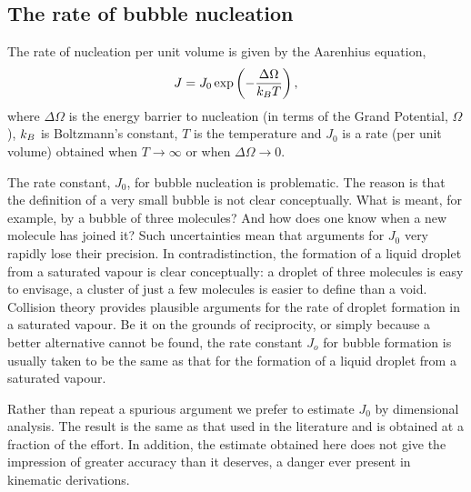 \subsection{The rate of bubble nucleation}


The rate of nucleation per unit volume is given by the Aarenhius equation, 
\begin{align}
J = J_0\exp \lr{-\frac{\Delta \Omega}{\kB T}},%
\label{eqn:nuc:J}
\end{align}
where $\Delta \Omega$ is the energy barrier to nucleation (in terms of the Grand Potential, $\Omega$),
$k_B$ is Boltzmann's constant, $T$ is the temperature
and $J_0$ is a rate  (per unit volume) obtained when $T\rightarrow \infty$ or when $\Delta \Omega \rightarrow 0$.

The rate constant, $J_0$, for bubble nucleation is problematic.
The reason is that the definition of a very small bubble is not clear conceptually.
What is meant, for example, by a bubble of three molecules?
And how does one know when a new molecule has joined it?
Such uncertainties mean that arguments for $J_0$ very rapidly lose their precision.
In contradistinction, the formation of a liquid droplet from a saturated vapour is clear conceptually:
a droplet of three molecules is easy to envisage, 
a cluster of just a few molecules is easier to define than a void.
Collision theory provides plausible arguments for the rate of droplet formation in a saturated vapour\cite{Katz1973}.
%
Be it on the grounds of reciprocity, or simply because a better alternative cannot be found,
the rate constant $J_o$ for bubble formation is usually taken to be the same 
as that for the formation of a liquid droplet from a saturated vapour\cite{Nyquist1995}.


Rather than repeat a spurious argument we prefer to estimate $J_0$ by dimensional analysis.
The result is the same as that used in the literature and is obtained at a fraction of the effort.
In addition, the estimate obtained here does not give the impression of greater accuracy than it deserves,
a danger ever present in kinematic derivations.

